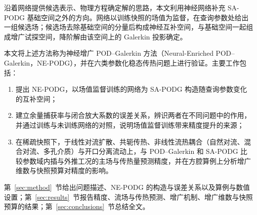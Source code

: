 沿着网络提供候选表示、物理方程确定解的思路，本文利用神经网络补充 SA-PODG 基础空间之外的方向。网络以训练快照的场值为监督，在查询参数处给出一组候选场；候选场去除基础空间的分量后构成神经互补空间，与基础空间一起组成增广试探空间，降阶解由该空间上的 Galerkin 投影确定。

本文将上述方法称为神经增广 POD–Galerkin 方法（Neural-Enriched POD–Galerkin，NE-PODG），并在六类参数化稳态传热问题上进行验证。主要工作包括：
\begin{enumerate}
\item 提出 NE-PODG，以场值监督训练的网络为 SA-PODG 构造随查询参数变化的互补空间；
\item 建立余量捕获率与闭合放大系数的误差关系，辨识两者在不同问题中的作用，并通过训练与未训练网络的对照，说明场值监督训练带来精度提升的来源；
\item 在稀疏快照下，于线性对流扩散、共轭传热、非线性流热耦合（自然对流、混合对流、多孔介质）与开口分离流动上，与 POD–Galerkin 和 SA-PODG 比较参数域内插与外推工况的主场与传热量预测精度，并在方腔算例上分析增广维数与快照预算对精度的影响。
\end{enumerate}

第~\ref{sec:method}~节给出问题描述、NE-PODG 的构造与误差关系以及算例与数值设置；第~\ref{sec:results}~节报告精度、流场与传热预测、增广机制、增广维数与快照预算的结果；第~\ref{sec:conclusions}~节总结全文。
